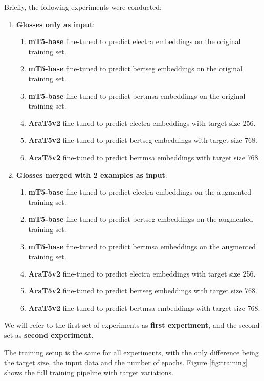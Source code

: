 \documentclass[12pt]{article}
\begin{document}
Briefly, the following experiments were conducted:
\begin{enumerate}
    \item \textbf{Glosses only as input}:
    \begin{enumerate}
        \item \textbf{mT5-base} fine-tuned to predict electra embeddings on the original training set.
        \item \textbf{mT5-base} fine-tuned to predict bertseg embeddings on the original training set.
        \item \textbf{mT5-base} fine-tuned to predict bertmsa embeddings on the original training set.
        \item \textbf{AraT5v2} fine-tuned to predict electra embeddings with target size 256.
        \item \textbf{AraT5v2} fine-tuned to predict bertseg embeddings with target size 768.
        \item \textbf{AraT5v2} fine-tuned to predict bertmsa embeddings with target size 768.
    \end{enumerate}
    \item \textbf{Glosses merged with 2 examples as input}:
    \begin{enumerate}
        \item \textbf{mT5-base} fine-tuned to predict electra embeddings on the augmented training set.
        \item \textbf{mT5-base} fine-tuned to predict bertseg embeddings on the augmented training set.
        \item \textbf{mT5-base} fine-tuned to predict bertmsa embeddings on the augmented training set.
        \item \textbf{AraT5v2} fine-tuned to predict electra embeddings with target size 256.
        \item \textbf{AraT5v2} fine-tuned to predict bertseg embeddings with target size 768.
        \item \textbf{AraT5v2} fine-tuned to predict bertmsa embeddings with target size 768.
    \end{enumerate}
\end{enumerate}

We will refer to the first set of experiments as \textbf{first experiment}, and the second set as \textbf{second experiment}.

The training setup is the same for all experiments, with the only difference being the target size, the input data and the number of epochs. Figure \ref{fig:training} shows the full training pipeline with target variations.
\end{document}

